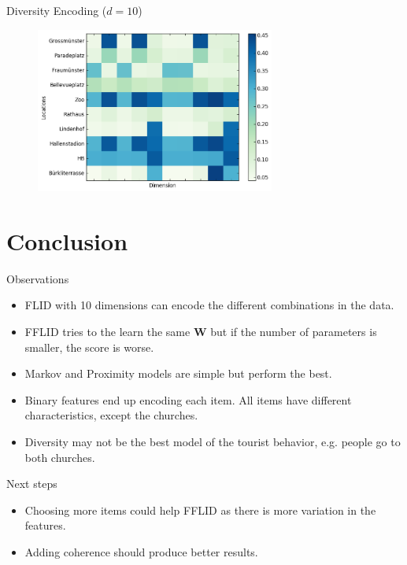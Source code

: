 \documentclass{beamer}
\begin{document}
  \begin{frame}{Diversity Encoding ($d=10$)}
    \begin{figure}
      \includegraphics[width=0.7\textwidth]{submodular_weights_f_2_d_10}
    \end{figure}
  \end{frame}
  
  
  
  \section{Conclusion}
  
  \begin{frame}{Observations}
    \begin{itemize}
      \item FLID with 10 dimensions can encode the different combinations in the data.
      \item FFLID tries to the learn the same $\bm{W}$ but if the number of parameters is smaller, the score is worse.
      \item Markov and Proximity models are simple but perform the best.
      \item Binary features end up encoding each item. All items have different characteristics, except the churches.
      \item Diversity may not be the best model of the tourist behavior, e.g. people go to both churches.
    \end{itemize}
  \end{frame}
  
  \begin{frame}{Next steps}
    \begin{itemize}
      \item Choosing more items could help FFLID as there is more variation in the features.
      \item Adding coherence should produce better results.
    \end{itemize}
  \end{frame}
\end{document}
